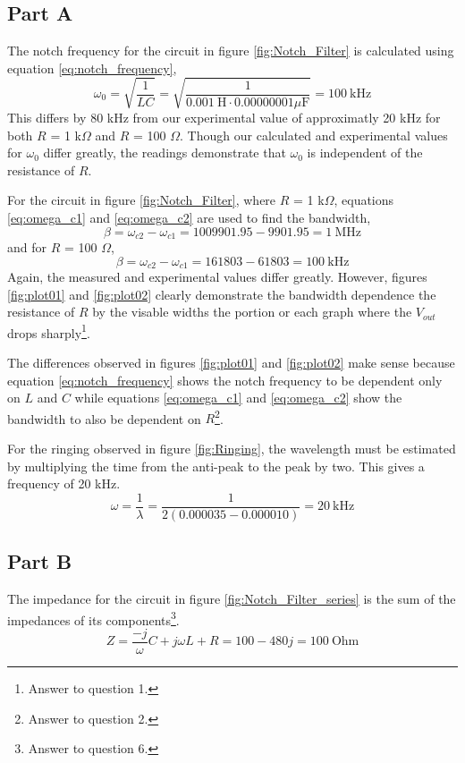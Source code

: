 \documentclass[11pt,onecolumn]{article}
\begin{document}
\subsection{Part A}\label{sec:Part_A}
The notch frequency for the circuit in figure \ref{fig:Notch_Filter} is calculated using equation \ref{eq:notch_frequency},
\begin{displaymath}
\omega_0 = \sqrt{\frac{1}{L C}} = \sqrt{\frac{1}{0.001\ \mathrm{H} \cdot 0.00000001 \mu \mathrm{F}}} = 100\ \mathrm{kHz}
\end{displaymath}
This differs by 80 kHz from our experimental value of approximatly 20 kHz for both $R$ = 1 k$\Omega$ and $R$ = 100 $\Omega$. Though our calculated and experimental values for $\omega_0$ differ greatly, the readings demonstrate that $\omega_0$ is independent of the resistance of $R$.

For the circuit in figure \ref{fig:Notch_Filter}, where $R$ = 1 k$\Omega$, equations \ref{eq:omega_c1} and \ref{eq:omega_c2} are used to find the bandwidth,
\begin{displaymath}
\beta = \omega_{c2} - \omega_{c1} = 1009901.95 - 9901.95 = 1\ \mathrm{MHz}
\end{displaymath}
and for $R$ = 100 $\Omega$,
\begin{displaymath}
\beta = \omega_{c2} - \omega_{c1} = 161803 - 61803 = 100\ \mathrm{kHz}
\end{displaymath}
Again, the measured and experimental values differ greatly. However, figures \ref{fig:plot01} and \ref{fig:plot02} clearly demonstrate the bandwidth dependence the resistance of $R$ by the visable widths the portion or each graph where the $V_{out}$ drops sharply\footnote{Answer to question 1.}.

The differences observed in figures \ref{fig:plot01} and \ref{fig:plot02} make sense because equation \ref{eq:notch_frequency} shows the notch frequency to be dependent only on $L$ and $C$ while equations \ref{eq:omega_c1} and \ref{eq:omega_c2} show the bandwidth to also be dependent on $R$\footnote{Answer to question 2.}.

For the ringing observed in figure \ref{fig:Ringing}, the wavelength must be estimated by multiplying the time from the anti-peak to the peak by two. This gives a frequency of 20 kHz.
\begin{displaymath}
\omega = \frac{1}{\lambda} = \frac{1}{2 (0.000035 - 0.000010)} = 20\ \mathrm{kHz}
\end{displaymath}

\subsection{Part B}
The impedance for the circuit in figure \ref{fig:Notch_Filter_series} is the sum of the impedances of its components\footnote{Answer to question 6.}.
\begin{displaymath}
Z = \frac{-j}{\omega}C + j \omega L + R = 100 - 480 j = 100\ \mathrm{Ohm}
\end{displaymath}
\end{document}
